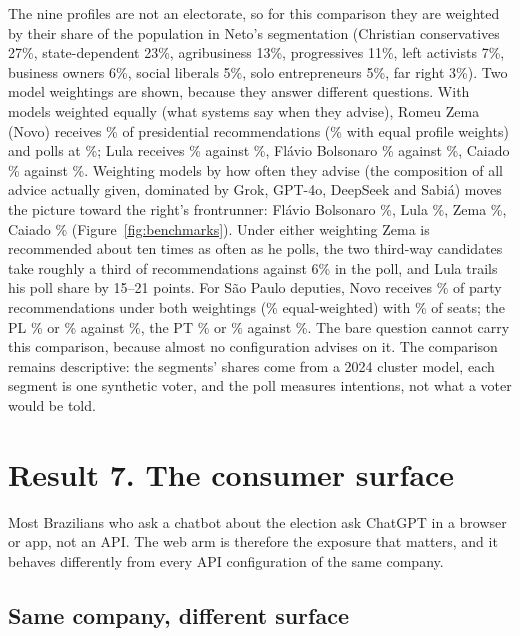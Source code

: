 \documentclass[11pt]{article}
\begin{document}
The nine profiles are not an electorate, so for this comparison they are weighted by their share of the population in Neto's segmentation (Christian conservatives 27\%, state-dependent 23\%, agribusiness 13\%, progressives 11\%, left activists 7\%, business owners 6\%, social liberals 5\%, solo entrepreneurs 5\%, far right 3\%). Two model weightings are shown, because they answer different questions. With models weighted equally (what systems say when they advise), Romeu Zema (Novo) receives \zemaRec\% of presidential recommendations (\zemaRecEq\% with equal profile weights) and polls at \zemaPoll\%; Lula receives \lulaRec\% against \lulaPoll\%, Flávio Bolsonaro \flavioRec\% against \flavioPoll\%, Caiado \caiadoRec\% against \caiadoPoll\%. Weighting models by how often they advise (the composition of all advice actually given, dominated by Grok, GPT-4o, DeepSeek and Sabiá) moves the picture toward the right's frontrunner: Flávio Bolsonaro \flavioRecAdv\%, Lula \lulaRecAdv\%, Zema \zemaRecAdv\%, Caiado \caiadoRecAdv\% (Figure~\ref{fig:benchmarks}). Under either weighting Zema is recommended about ten times as often as he polls, the two third-way candidates take roughly a third of recommendations against 6\% in the poll, and Lula trails his poll share by 15--21 points. For São Paulo deputies, Novo receives \novoRec\% of party recommendations under both weightings (\novoRecEq\% equal-weighted) with \novoSeats\% of seats; the PL \plRec\% or \plRecAdv\% against \plSeats\%, the PT \ptRec\% or \ptRecAdv\% against \ptSeats\%. The bare question cannot carry this comparison, because almost no configuration advises on it. The comparison remains descriptive: the segments' shares come from a 2024 cluster model, each segment is one synthetic voter, and the poll measures intentions, not what a voter would be told.

\section{Result 7. The consumer surface}

Most Brazilians who ask a chatbot about the election ask ChatGPT in a browser or app, not an API. The web arm is therefore the exposure that matters, and it behaves differently from every API configuration of the same company.

\subsection{Same company, different surface}
\end{document}
